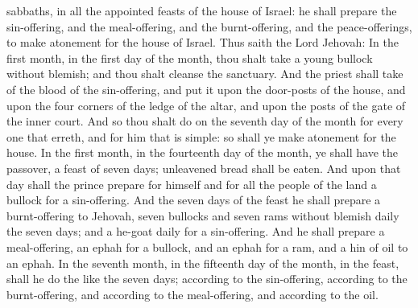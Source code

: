sabbaths, in all the appointed feasts of the house of Israel: he shall prepare the sin-offering, and the meal-offering, and the burnt-offering, and the peace-offerings, to make atonement for the house of Israel.  Thus saith the Lord Jehovah: In the first month, in the first day of the month, thou shalt take a young bullock without blemish; and thou shalt cleanse the sanctuary. And the priest shall take of the blood of the sin-offering, and put it upon the door-posts of the house, and upon the four corners of the ledge of the altar, and upon the posts of the gate of the inner court. And so thou shalt do on the seventh day of the month for every one that erreth, and for him that is simple: so shall ye make atonement for the house.  In the first month, in the fourteenth day of the month, ye shall have the passover, a feast of seven days; unleavened bread shall be eaten. And upon that day shall the prince prepare for himself and for all the people of the land a bullock for a sin-offering. And the seven days of the feast he shall prepare a burnt-offering to Jehovah, seven bullocks and seven rams without blemish daily the seven days; and a he-goat daily for a sin-offering. And he shall prepare a meal-offering, an ephah for a bullock, and an ephah for a ram, and a hin of oil to an ephah. In the seventh month, in the fifteenth day of the month, in the feast, shall he do the like the seven days; according to the sin-offering, according to the burnt-offering, and according to the meal-offering, and according to the oil. 

